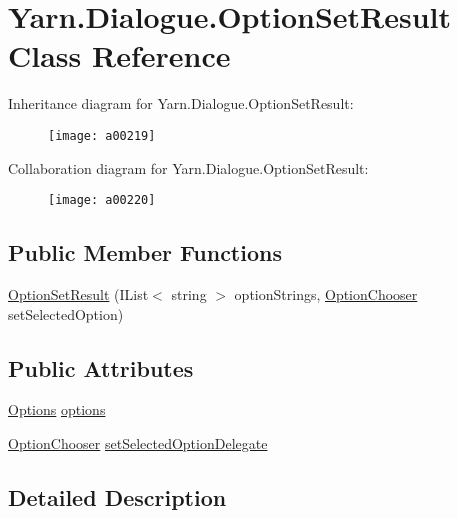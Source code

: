 \hypertarget{a00060}{\section{Yarn.\-Dialogue.\-Option\-Set\-Result Class Reference}
\label{a00060}
}


Inheritance diagram for Yarn.\-Dialogue.\-Option\-Set\-Result\-:
\nopagebreak
\begin{figure}[H]
\begin{center}
\leavevmode
\texttt{[image: a00219]}
\end{center}
\end{figure}


Collaboration diagram for Yarn.\-Dialogue.\-Option\-Set\-Result\-:
\nopagebreak
\begin{figure}[H]
\begin{center}
\leavevmode
\texttt{[image: a00220]}
\end{center}
\end{figure}
\subsection*{Public Member Functions}
\begin{DoxyCompactItemize}
\item 
\hyperlink{a00060_a934c02fb1047ffd05b2b5a9c6fcd7acb}{Option\-Set\-Result} (I\-List$<$ string $>$ option\-Strings, \hyperlink{a00026_a39866cbb03c03a35805d598b5d4ad553}{Option\-Chooser} set\-Selected\-Option)
\end{DoxyCompactItemize}
\subsection*{Public Attributes}
\begin{DoxyCompactItemize}
\item 
\hyperlink{a00026_a00161}{Options} \hyperlink{a00060_abda9c3047ff9d3c3ec5540566a239315}{options}
\item 
\hyperlink{a00026_a39866cbb03c03a35805d598b5d4ad553}{Option\-Chooser} \hyperlink{a00060_a6f2683598cf0f62b76bb864640cc79dd}{set\-Selected\-Option\-Delegate}
\end{DoxyCompactItemize}


\subsection{Detailed Description}


